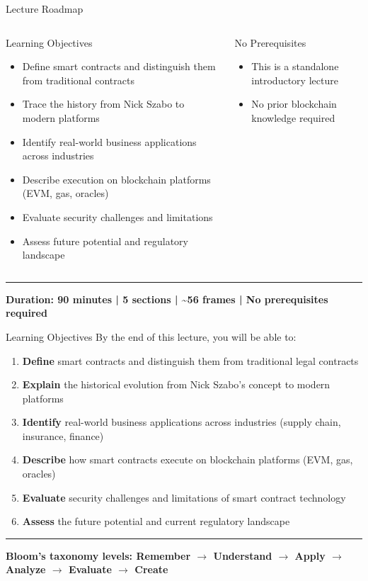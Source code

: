 \documentclass[8pt,aspectratio=169]{beamer}
\newcommand{\bottomnote}[1]{\vfill\vspace{-2mm}\textcolor{mllavender2}{\rule{\textwidth}{0.4pt}}\vspace{1mm}\footnotesize\textbf{#1}}
\begin{document}
\begin{frame}{Lecture Roadmap}
\begin{columns}[T]
\begin{block}{Learning Objectives}
\footnotesize
\begin{itemize}
  \item Define smart contracts and distinguish them from traditional contracts
  \item Trace the history from Nick Szabo to modern platforms
  \item Identify real-world business applications across industries
  \item Describe execution on blockchain platforms (EVM, gas, oracles)
  \item Evaluate security challenges and limitations
  \item Assess future potential and regulatory landscape
\end{itemize}
\end{block}
\vspace{1mm}
\begin{block}{No Prerequisites}
\footnotesize
\begin{itemize}
  \item This is a standalone introductory lecture
  \item No prior blockchain knowledge required
\end{itemize}
\end{block}
\end{columns}
\bottomnote{Duration: 90 minutes | 5 sections | \textasciitilde56 frames | No prerequisites required}
\end{frame}

\begin{frame}{Learning Objectives}
By the end of this lecture, you will be able to:
\begin{enumerate}
\item \textbf{Define} smart contracts and distinguish them from traditional legal contracts
\item \textbf{Explain} the historical evolution from Nick Szabo's concept to modern platforms
\item \textbf{Identify} real-world business applications across industries (supply chain, insurance, finance)
\item \textbf{Describe} how smart contracts execute on blockchain platforms (EVM, gas, oracles)
\item \textbf{Evaluate} security challenges and limitations of smart contract technology
\item \textbf{Assess} the future potential and current regulatory landscape
\end{enumerate}
\bottomnote{Bloom's taxonomy levels: Remember $\rightarrow$ Understand $\rightarrow$ Apply $\rightarrow$ Analyze $\rightarrow$ Evaluate $\rightarrow$ Create}
\end{frame}
\end{document}
